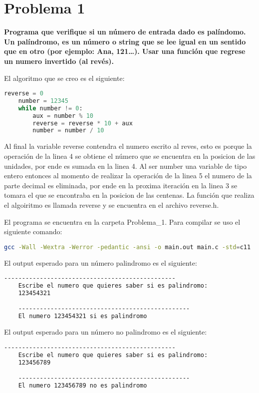 \section*{Problema 1}
\textbf{Programa que verifique si un número de entrada dado es palíndomo. Un palíndromo, es un número o string que se lee igual en un sentido que en otro (por ejemplo: Ana, 121…). Usar una función que regrese un numero invertido (al revés).}

El algoritmo que se creo es el siguiente:
\begin{lstlisting}[language=python]
    reverse = 0
    number = 12345
    while number != 0:
        aux = number % 10
        reverse = reverse * 10 + aux
        number = number / 10
\end{lstlisting}

Al final la variable reverse contendra el numero escrito al reves, esto es porque la operación de la linea 4 se obtiene el número que se encuentra en la posicion de las unidades, por ende es sumada en la linea 4. Al ser number una variable de tipo entero entonces al momento de realizar la operación de la linea 5 el numero de la parte decimal es eliminada, por ende en la proxima iteración en la linea 3 se tomara el que se encontraba en la posicion de las centenas. La función que realiza el algoiritmo es llamada \textcolor{title}{reverse} y se encuentra en el archivo \textcolor{citecolor}{reverse.h}.

El programa se encuentra en la carpeta \textcolor{citecolor}{Problema\_1}. Para compilar se uso el siguiente comando:

\begin{lstlisting}[language=bash]
    gcc -Wall -Wextra -Werror -pedantic -ansi -o main.out main.c -std=c11
\end{lstlisting}

El output esperado para un número palindromo es el siguiente:

\begin{lstlisting}[language=bash]
    ------------------------------------------------
    Escribe el numero que quieres saber si es palindromo:
    123454321

    ------------------------------------------------
    El numero 123454321 si es palindromo
\end{lstlisting}

El output esperado para un número no palindromo es el siguiente:

\begin{lstlisting}[language=bash]
    ------------------------------------------------
    Escribe el numero que quieres saber si es palindromo:
    123456789

    ------------------------------------------------
    El numero 123456789 no es palindromo
\end{lstlisting}